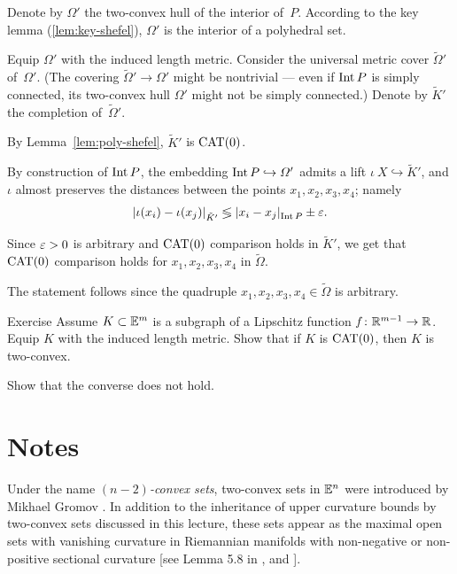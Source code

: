 Denote by $\Omega'$ the two-convex hull of the interior of~$P$.
According to the key lemma (\ref{lem:key-shefel}), $\Omega'$ is the interior of a polyhedral set.

Equip $\Omega'$ with the induced length metric.
Consider the universal metric cover $\tilde\Omega'$ of~$\Omega'$.
(The covering $\tilde\Omega'\to\Omega'$ might be nontrivial ---
even if $\operatorname{\rm Int}\nolimits P$ is simply connected, its two-convex hull $\Omega'$ might not be simply connected.)
Denote by $\tilde K'$ the completion of~$\tilde\Omega'$.

By Lemma~\ref{lem:poly-shefel}, $\tilde K'$ is $\mathrm{CAT}(0)$.

By construction of $\operatorname{\rm Int}\nolimits P$, the embedding $\operatorname{\rm Int}\nolimits P\hookrightarrow \varOmega'$
admits a lift $\iota\:X\hookrightarrow \tilde K'$, and $\iota$ almost preserves the distances between the points $x_1,x_2,x_3,x_4$;
namely 
\begin{align*}
\dist{\iota(x_i)}{\iota(x_j)}{\tilde K'}\lessgtr \dist{x_i}{x_j}{\Int P}\pm\eps.
\end{align*}

Since $\varepsilon>0$ is arbitrary and $\mathrm{CAT}(0)$ comparison holds in $\tilde K'$,
we get that $\mathrm{CAT}(0)$ comparison holds for $x_1,x_2,x_3,x_4$ in $\tilde \Omega$.

The statement follows since the quadruple $x_1,x_2,x_3,x_4\in\tilde\Omega$ is arbitrary.
\qeds

\begin{thm}{Exercise}\label{ex:CAT=>two-convex}\label{ex:two-convex-not-a-CAT}
Assume $K\subset \mathbb{E}^{m}$ is a subgraph of a Lipschitz function $f\colon\mathbb{R}^{m-1}\to\mathbb{R}$.
Equip $K$ with the induced length metric.
Show that if $K$ is $\mathrm{CAT}(0)$, then $K$ is two-convex.

Show that the converse does not hold.
\end{thm}

\section{Notes}

Under the name {}\emph{$(n-2)$-convex sets}, 
two-convex sets in $\mathbb{E}^n$ were introduced by Mikhael Gromov \cite{gromov-1991}.
In addition to the inheritance of upper curvature bounds by two-convex sets discussed in this lecture, 
these sets appear as the maximal open sets with vanishing curvature in Riemannian manifolds with non-negative or non-positive sectional curvature [see Lemma 5.8 in , 
and ].

